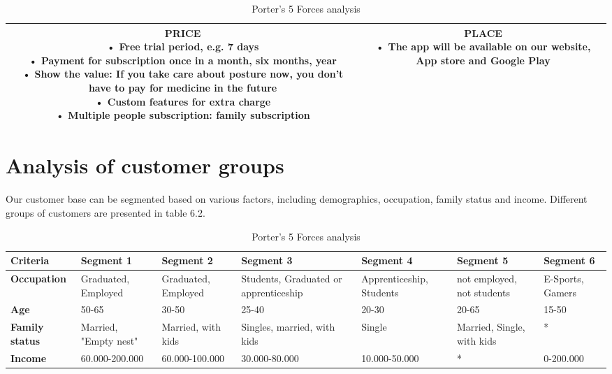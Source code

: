 \begin{table}[H]
\begin{tabular}{|c|c|}
{        \textbf{PRICE}\\
        •	Free trial period, e.g. 7 days\\
        •	Payment for subscription once in a month, six months, year\\
        •	Show the value: If you take care about posture now, you don't have to pay for medicine in the future\\
        •	Custom features for extra charge\\
        •	Multiple people subscription: family subscription\\  
        \vspace{5pt}} & \parbox{7cm}{\vspace{5pt}
        \textbf{PLACE}\\
        •	The app will be available on our website, App store and Google Play     
        \vspace{5pt}} \\
    \hline
    \end{tabular}
    \caption{Porter's 5 Forces analysis}
\end{table}

\section{Analysis of customer groups}

Our customer base can be segmented based on various factors, including demographics, occupation, family status and income. Different groups of customers are presented in table 6.2.

\begin{table}[H]
    \centering
    \small 
    \begin{tabular}{|p{1.9cm}|p{2cm}|p{2cm}|p{2cm}|p{2.1cm}|p{2cm}|p{2cm}|}
        \hline
        \textbf{Criteria} & \textbf{Segment 1} & \textbf{Segment 2} & \textbf{Segment 3} & \textbf{Segment 4} & \textbf{Segment 5} & \textbf{Segment 6} \\
        \hline
        \textbf{Occupation} & Graduated, Employed & Graduated, Employed	& Students, Graduated or apprenticeship	& Apprenticeship, Students	& not employed, not students & E-Sports, Gamers \\
        \hline
        \textbf{Age} & 50-65 & 30-50 & 25-40 & 20-30 & 20-65 & 15-50 \\
        \hline
        \textbf{Family status} & Married, "Empty nest" & Married, with kids & Singles, married, with kids & Single & Married, Single, with kids & *\\
        \hline
        \textbf{Income} & 60.000-200.000 & 60.000-100.000 & 30.000-80.000 & 10.000-50.000 & * & 0-200.000\\
        \hline
    \end{tabular}
    \caption{Porter's 5 Forces analysis}
    \label{tab:example}
\end{table}

